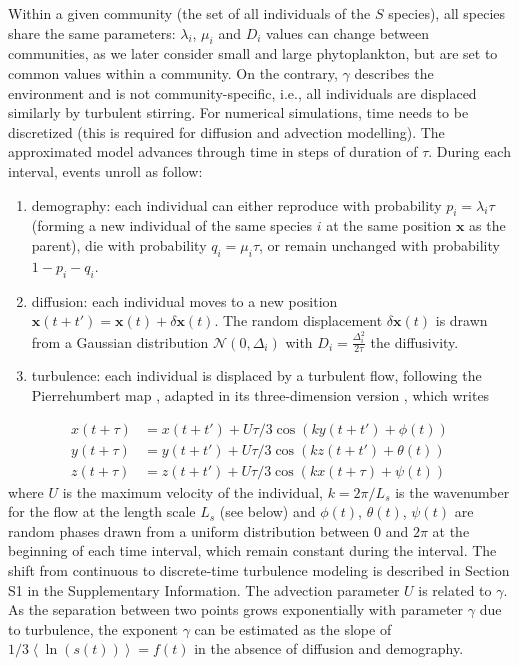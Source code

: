 \documentclass[english]{article}
\begin{document}
Within a given community (the set of all individuals of the $S$ species),
all species share the same parameters: $\lambda_{i}$, $\mu_{i}$
and $D_{i}$ values can change between communities, as we later consider
small and large phytoplankton, but are set to common values within
a community. On the contrary, $\gamma$ describes the environment
and is not community-specific, i.e., all individuals are displaced
similarly by turbulent stirring.  For numerical simulations, time
needs to be discretized (this is required for diffusion and advection
modelling). The approximated model advances through time in steps
of duration of $\tau$. During each interval, events unroll as follow:

\begin{enumerate}
\item demography: each individual can either reproduce with probability
$p_{i}=\lambda_{i}\tau$ (forming a new individual of the same species
$i$ at the same position $\mathbf{x}$ as the parent), die with probability
$q_{i}=\mu_{i}\tau$, or remain unchanged with probability $1-p_{i}-q_{i}$.
\item diffusion: each individual moves to a new position $\mathbf{x}(t+t')=\mathbf{x}(t)+\delta\mathbf{x}(t)$.
The random displacement $\delta\mathbf{x}(t)$ is drawn from a Gaussian
distribution $\mathcal{N}(0,\Delta_{i})$ with $D_{i}=\frac{\Delta_{i}^{2}}{2\tau}$
the diffusivity.
\item turbulence: each individual is displaced by a turbulent flow, following
the Pierrehumbert map \citep{pierrehumbert_tracer_1994}, adapted
in its three-dimension version \citep{ngan_scalar_2011}, which writes
\end{enumerate}
\begin{equation}
\begin{array}{cc}
x(t+\tau) & =x(t+t')+U\tau/3\cos\left(ky(t+t')+\phi(t)\right)\\
y(t+\tau) & =y(t+t')+U\tau/3\cos\left(kz(t+t')+\theta(t)\right)\\
z(t+\tau) & =z(t+t')+U\tau/3\cos\left(kx(t+\tau)+\psi(t)\right)
\end{array}
\end{equation}
where $U$ is the maximum velocity of the individual, $k=2\pi/L_{s}$
is the wavenumber for the flow at the length scale $L_{s}$ (see below)
and $\phi(t)$, $\theta(t)$, $\psi(t)$ are random phases drawn from
a uniform distribution between $0$ and $2\pi$ at the beginning of
each time interval, which remain constant during the interval. The
shift from continuous to discrete-time turbulence modeling is described
in Section S1 in the Supplementary Information. The advection parameter
$U$ is related to $\gamma$. As the separation between two points
grows exponentially with parameter $\gamma$ due to turbulence, the exponent $\gamma$ can be estimated as the
slope of $1/3\left\langle \ln(s(t))\right\rangle =f(t)$ in the absence
of diffusion and demography.
\end{document}

